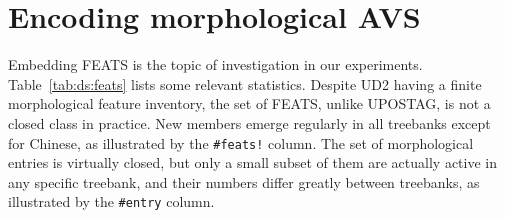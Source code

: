 \documentclass[11pt]{article}
\begin{document}
\section{Encoding morphological AVS}
\label{sec:feats}

Embedding FEATS is the topic of investigation in our experiments.
Table~\ref{tab:ds:feats} lists some relevant statistics.
Despite UD2 having a finite morphological feature inventory,
the set of FEATS, unlike UPOSTAG, is not a closed class in practice.
New members emerge regularly in all treebanks except for Chinese,
as illustrated by the \texttt{\#feats!} column.
The set of morphological entries is virtually closed,
but only a small subset of them are actually active in any specific treebank,
and their numbers differ greatly between treebanks,
as illustrated by the \texttt{\#entry} column.
\end{document}
